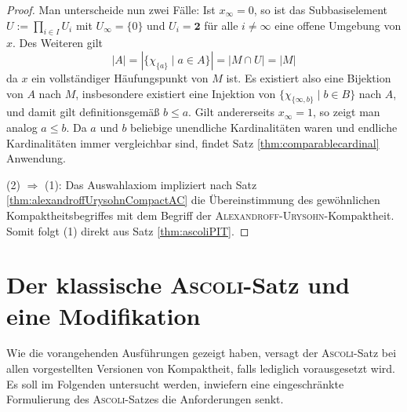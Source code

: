 \begin{proof}
  Man unterscheide nun zwei Fälle:
  Ist $x_\infty = 0$, so ist das Subbasiselement $U := \prod_{i \in I} U_i$ mit $U_\infty = \{0\}$ und $U_i = \mathbf{2}$ für alle $i \neq \infty$ eine offene Umgebung von $x$. 
  Des Weiteren gilt
  \begin{displaymath}
    |A|
    = |\{\chi_{\{a\}} \mid a \in A\}|
    = | M \cap U |
    = | M |
  \end{displaymath}
  da $x$ ein vollständiger Häufungspunkt von $M$ ist.
  Es existiert also eine Bijektion von $A$ nach $M$, insbesondere existiert eine Injektion von $\{\chi_{\{\infty,b\}} \mid b \in B\}$ nach $A$, und damit gilt definitionsgemäß $b \leq a$. 
  Gilt andererseits $x_\infty = 1$, so zeigt man analog $a \leq b$.
  Da $a$ und $b$ beliebige unendliche Kardinalitäten waren und endliche Kardinalitäten immer vergleichbar sind, findet Satz \ref{thm:comparablecardinal} Anwendung.

  (2) $\Rightarrow$ (1): Das Auswahlaxiom impliziert nach Satz \ref{thm:alexandroffUrysohnCompactAC} die Übereinstimmung des gewöhnlichen Kompaktheitsbegriffes mit dem Begriff der \textsc{Alexandroff}\hyp{}\textsc{Urysohn}\hyp{}Kompaktheit. Somit folgt (1) direkt aus Satz \ref{thm:ascoliPIT}.
\end{proof}

\section{Der klassische \textsc{Ascoli}\hyp{}Satz und eine Modifikation}

Wie die vorangehenden Ausführungen gezeigt haben, versagt der \textsc{Ascoli}\hyp{}Satz bei allen vorgestellten Versionen von Kompaktheit, falls lediglich \ZF vorausgesetzt wird. 
Es soll im Folgenden untersucht werden, inwiefern eine eingeschränkte Formulierung des \textsc{Ascoli}\hyp{}Satzes die Anforderungen senkt.

